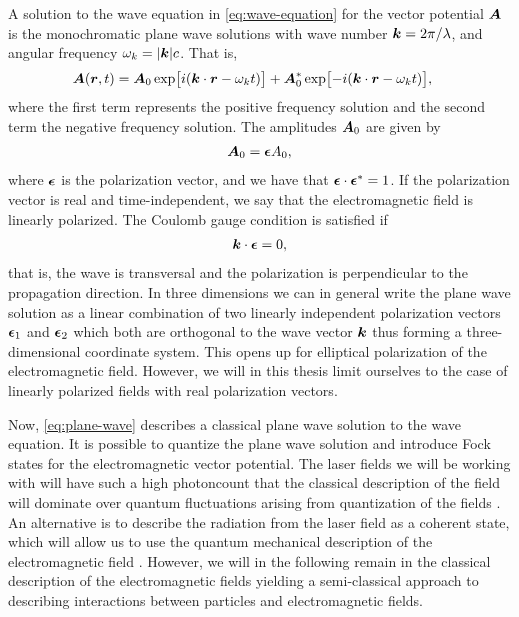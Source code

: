         A solution to the wave equation in \autoref{eq:wave-equation} for the
        vector potential $\boldsymbol{A}$ is the monochromatic plane wave solutions
        with wave number $\boldsymbol{k} = 2\pi / \lambda$, and angular frequency
        $\omega_k = \abs{\boldsymbol{k}} c$.
        That is,
        \begin{align}
            \boldsymbol{A}(\boldsymbol{r}, t)
            &= \boldsymbol{A}_0 \exp[i(\boldsymbol{k}\cdot \boldsymbol{r} - \omega_k t)]
            + \boldsymbol{A}^{*}_0 \exp[-i(\boldsymbol{k}\cdot\boldsymbol{r} - \omega_k t)],
            \label{eq:plane-wave}
        \end{align}
        where the first term represents the positive frequency solution and the
        second term the negative frequency solution.
        The amplitudes $\boldsymbol{A}_0$ are given by
        \begin{align}
            \boldsymbol{A}_0 = \boldsymbol{\epsilon} A_0,
        \end{align}
        where $\boldsymbol{\epsilon}$ is the polarization vector, and we have that
        $\boldsymbol{\epsilon}\cdot\boldsymbol{\epsilon}^{*} = 1$.
        If the polarization vector is real and time-independent, we say that the
        electromagnetic field is linearly polarized.
        The Coulomb gauge condition is satisfied if
        \begin{align}
            \boldsymbol{k}\cdot \boldsymbol{\epsilon} = 0,
        \end{align}
        that is, the wave is transversal and the polarization is perpendicular
        to the propagation direction.
        In three dimensions we can in general write the plane wave solution as a
        linear combination of two linearly independent polarization vectors
        $\boldsymbol{\epsilon}_1$ and $\boldsymbol{\epsilon}_2$ which both are orthogonal to
        the wave vector $\boldsymbol{k}$ thus forming a three-dimensional coordinate
        system.
        This opens up for elliptical polarization of the electromagnetic field.
        However, we will in this thesis limit ourselves to the case of linearly
        polarized fields with real polarization vectors.

        Now, \autoref{eq:plane-wave} describes a classical plane wave solution
        to the wave equation.
        It is possible to quantize the plane wave solution and introduce Fock
        states for the electromagnetic vector potential.
        The laser fields we will be working with will have such a high
        photoncount that the classical description of the field will dominate
        over quantum fluctuations arising from quantization of the fields
        \cite{joachain2012atoms}.
        An alternative is to describe the radiation from the laser field as a
        coherent state, which will allow us to use the quantum mechanical
        description of the electromagnetic field \cite{joachain2012atoms,
        modern-qm}.
        However, we will in the following remain in the classical description of
        the electromagnetic fields yielding a semi-classical approach to
        describing interactions between particles and electromagnetic fields.

